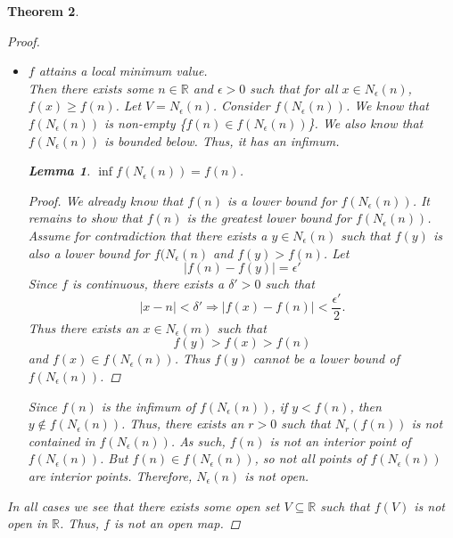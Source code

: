 \documentclass{amsart}
\newtheorem{theorem}{Theorem}
\newtheorem{lemma}[theorem]{Lemma}
\begin{document}
\begin{enumerate}[1.]
\begin{theorem}
\begin{proof}
\begin{itemize}
                \item $f$ attains a local minimum value. \\
                Then there exists some $n \in \mathbb{R}$ and $\epsilon > 0$ such that for all $x \in N_\epsilon(n)$, $f(x) \geq f(n)$.
                Let $V = N_\epsilon(n)$. Consider $f(N_\epsilon(n))$. We know that $f(N_\epsilon(n))$ is non-empty \{$f(n) \in f(N_\epsilon(n))$\}.
                We also know that $f(N_\epsilon(n))$ is bounded below. Thus, it has an infimum. 
                \begin{lemma} $\inf f(N_\epsilon(n)) = f(n)$.
                    \begin{proof}
                    We already know that $f(n)$ is a lower bound for $f(N_\epsilon(n))$. It remains to show that 
                    $f(n)$ is the greatest lower bound for $f(N_\epsilon(n))$. Assume for contradiction that there exists a $y \in N_\epsilon(n)$ such that $f(y)$ is also a lower bound for $f(N_\epsilon(n)$ and $f(y) > f(n)$. 
                    Let
                    \[
                        | f(n) - f(y) | = \epsilon'     
                    \]
                    Since $f$ is continuous,  there exists a $\delta' > 0$ such that
                    \[
                        |x - n| < \delta' \Rightarrow |f(x) - f(n)| < \frac{\epsilon'}{2}.    
                    \]
                    Thus there exists an $x \in N_\epsilon(m)$ such that
                    \[
                        f(y) > f(x) > f(n)    
                    \]
                    and $f(x) \in f(N_\epsilon(n))$. Thus $f(y)$ cannot be a lower bound of $f(N_\epsilon(n))$.
                    \end{proof}
                \end{lemma}
                Since $f(n)$ is the infimum of $f(N_\epsilon(n))$, if $y < f(n)$, then $y \notin f(N_\epsilon(n))$.
                Thus, there exists an $r > 0$ such that $N_r(f(n))$ is not contained in $f(N_\epsilon(n))$. As such, 
                $f(n)$ is not an interior point of $f(N_\epsilon(n))$. But $f(n) \in f(N_\epsilon(n))$, 
                so not all points of $f(N_\epsilon(n))$ are interior points. Therefore, $N_\epsilon(n)$ is not open.
            \end{itemize}
            In all cases we see that there exists some open set $V \subseteq \mathbb{R}$ such that 
            $f(V)$ is not open in $\mathbb{R}$. Thus, $f$ is not an open map.
        \end{proof}
    \end{theorem}
    

\end{enumerate}
\end{document}
